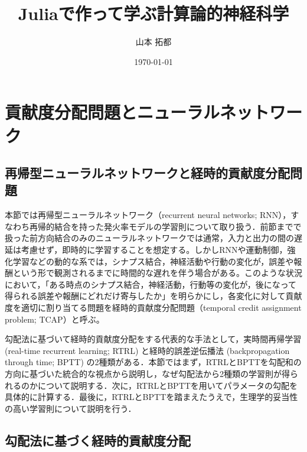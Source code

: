 \documentclass[titlepage]{ltjsbook}
\title{\Huge \textbf{Juliaで作って学ぶ計算論的神経科学}}
\author{\huge 山本 拓都}
\date{\huge \today}
\begin{document}
\setcounter{tocdepth}{2}
\tableofcontents
\clearpage
\chapter{貢献度分配問題とニューラルネットワーク}
\section{再帰型ニューラルネットワークと経時的貢献度分配問題}
本節では再帰型ニューラルネットワーク（recurrent neural networks; RNN），すなわち再帰的結合を持った発火率モデルの学習則について取り扱う．前節までで扱った前方向結合のみのニューラルネットワークでは通常，入力と出力の間の遅延は考慮せず，即時的に学習することを想定する。しかしRNNや運動制御，強化学習などの動的な系では，シナプス結合，神経活動や行動の変化が，誤差や報酬という形で観測されるまでに時間的な遅れを伴う場合がある。このような状況において，「ある時点のシナプス結合，神経活動，行動等の変化が，後になって得られる誤差や報酬にどれだけ寄与したか」を明らかにし，各変化に対して貢献度を適切に割り当てる問題を経時的貢献度分配問題（temporal credit assignment problem; TCAP）と呼ぶ。

勾配法に基づいて経時的貢献度分配をする代表的な手法として，実時間再帰学習 (real-time recurrent learning; RTRL) と経時的誤差逆伝播法  (backpropagation through time; BPTT) の2種類がある．本節ではまず，RTRLとBPTTを勾配和の方向に基づいた統合的な視点から説明し，なぜ勾配法から2種類の学習則が得られるのかについて説明する．次に，RTRLとBPTTを用いてパラメータの勾配を具体的に計算する．最後に，RTRLとBPTTを踏まえたうえで，生理学的妥当性の高い学習則について説明を行う．

\section{勾配法に基づく経時的貢献度分配}
\end{document}
